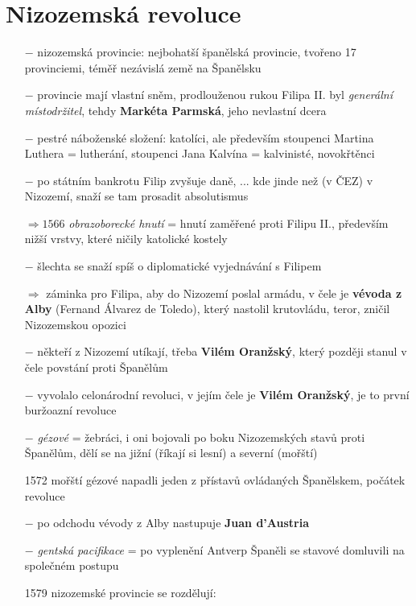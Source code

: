\documentclass{article}
\begin{document}
\section*{Nizozemská revoluce}
\begin{itemize}
    \vspace{-0.5em}
    \setlength\itemsep{0.15em}
    \item[$-$] nizozemská provincie: nejbohatší španělská provincie, tvořeno 17 provinciemi, téměř nezávislá země na Španělsku
    \item[$-$] provincie mají vlastní sněm, prodlouženou rukou Filipa II. byl \textit{generální místodržitel}, tehdy \textbf{Markéta Parmská}, jeho nevlastní dcera
    \item[$-$] pestré náboženské složení: katolíci, ale především stoupenci Martina Luthera = lutherání, stoupenci Jana Kalvína = kalvinisté, novokřtěnci
    \item[$-$] po státním bankrotu Filip zvyšuje daně, ... kde jinde než (v ČEZ) v Nizozemí, snaží se tam prosadit absolutismus
    \item[$\Rightarrow 1566$] \textit{obrazoborecké hnutí} = hnutí zaměřené proti Filipu II., především nižší vrstvy, které ničily katolické kostely
    \item[$-$] šlechta se snaží spíš o diplomatické vyjednávání s Filipem
    \item[$\Rightarrow$] záminka pro Filipa, aby do Nizozemí poslal armádu, v čele je \textbf{vévoda z Alby} (Fernand Álvarez de Toledo), který nastolil krutovládu, teror, zničil Nizozemskou opozici
    \item[$-$] někteří z Nizozemí utíkají, třeba \textbf{Vilém Oranžský}, který později stanul v čele povstání proti Španělům
    \item[$-$]  vyvolalo celonárodní revoluci, v jejím čele je \textbf{Vilém Oranžský}, je to první buržoazní revoluce
    \item[$-$] \textit{gézové} = žebráci, i oni bojovali po boku Nizozemských stavů proti Španělům, dělí se na jižní (říkají si lesní) a severní (mořští)
    \item[1572] mořští gézové napadli jeden z přístavů ovládaných Španělskem, počátek revoluce
    \item[$-$] po odchodu vévody z Alby nastupuje \textbf{Juan d'Austria}
    \item[$-$] \textit{gentská pacifikace} = po vyplenění Antverp Španěli se stavové domluvili na společném postupu
    \item[1579] nizozemské provincie se rozdělují:

\end{itemize}
\end{document}
